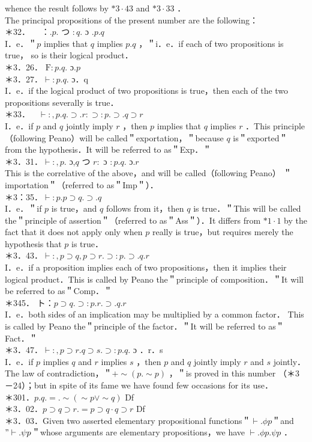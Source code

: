 \documentclass[10pt]{article}
\begin{document}
whence the result follows by $* 3 \cdot 43$ and $* 3 \cdot 33$ ．\\
The principal propositions of the present number are the following：\\
＊32．$\quad$ ：.$p$. つ $: q$. ɔ $. p . q$\\
I．e．＂$p$ implies that $q$ implies $p . q$ ，＂i．e．if each of two propositions is true， so is their logical product．\\
＊3．26． $\mathrm{F}: p . q$. ɔ.$p$\\
＊3．27．$\vdash: p . q$. ɔ．q\\
I．e．if the logical product of two propositions is true，then each of the two propositions severally is true．\\
＊33．$\quad \vdash:, p . q . \supset . r: \supset: p . \supset . q \supset r$\\
I．e．if $p$ and $q$ jointly imply $r$ ，then $p$ implies that $q$ implies $r$ ．This principle（following Peano）will be called＂exportation，＂because $q$ is＂exported＂ from the hypothesis．It will be referred to as＂Exp．＂\\
＊3．31．$\vdash:, p$. ɔ,$q$ つ $r:$ ɔ $: p . q$. ɔ.$r$\\
This is the correlative of the above，and will be called（following Peano） ＂importation＂（referred to as＂Imp＂）．\\
＊3：35．$\vdash: p . p \supset q . \supset . q$\\
I．e．＂if $p$ is true，and $q$ follows from it，then $q$ is true．＂This will be called the＂principle of assertion＂（referred to as＂Ass＂）．It differs from $* 1 \cdot 1$ by the fact that it does not apply only when $p$ really is true，but requires merely the hypothesis that $p$ is true．\\
＊3．43．$\vdash:, p \supset q, p \supset r . \supset: p . \supset . q . r$\\
I．e．if a proposition implies each of two propositions，then it implies their logical product．This is called by Peano the＂principle of composition．＂It will be referred to as＂Comp．＂\\
＊345． ト：$p \supset q . \supset: p . r . \supset . q . r$\\
I．e．both sides of an implication may be multiplied by a common factor． This is called by Peano the＂principle of the factor．＂It will be referred to as＂Fact．＂\\
＊3．47．$\vdash:, p \supset r . q \supset s . \supset: p . q$. ɔ ．r．s\\
I．e．if $p$ implies $q$ and $r$ implies $s$ ，then $p$ and $q$ jointly imply $r$ and $s$ jointly．The law of contradiction，＂$+\sim(p . \sim p)$ ，＂is proved in this number （＊3－24）；but in spite of its fame we have found few occasions for its use．\\
＊301．$p . q .=. \sim(\sim p \vee \sim q)$ Df\\
＊3．02．$p \supset q \supset r .=p \supset q \cdot q \supset r$ Df\\
＊3．03．Given two asserted elementary propositional functions＂$\vdash . \phi p$＂and $" \vdash . \psi p$＂whose arguments are elementary propositions，we have $\vdash . \phi p . \psi p$ ．
\end{document}

